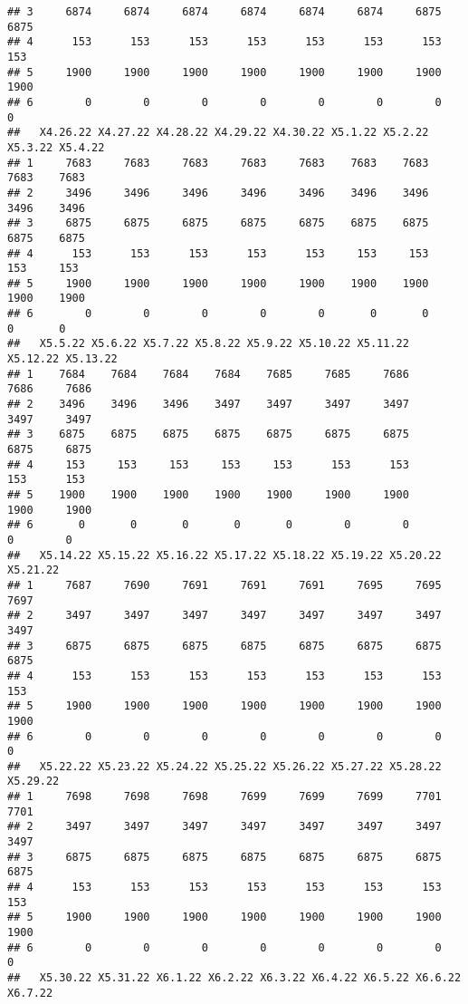 \documentclass[
]{article}
\begin{document}
\begin{verbatim}
## 3     6874     6874     6874     6874     6874     6874     6875     6875
## 4      153      153      153      153      153      153      153      153
## 5     1900     1900     1900     1900     1900     1900     1900     1900
## 6        0        0        0        0        0        0        0        0
##   X4.26.22 X4.27.22 X4.28.22 X4.29.22 X4.30.22 X5.1.22 X5.2.22 X5.3.22 X5.4.22
## 1     7683     7683     7683     7683     7683    7683    7683    7683    7683
## 2     3496     3496     3496     3496     3496    3496    3496    3496    3496
## 3     6875     6875     6875     6875     6875    6875    6875    6875    6875
## 4      153      153      153      153      153     153     153     153     153
## 5     1900     1900     1900     1900     1900    1900    1900    1900    1900
## 6        0        0        0        0        0       0       0       0       0
##   X5.5.22 X5.6.22 X5.7.22 X5.8.22 X5.9.22 X5.10.22 X5.11.22 X5.12.22 X5.13.22
## 1    7684    7684    7684    7684    7685     7685     7686     7686     7686
## 2    3496    3496    3496    3497    3497     3497     3497     3497     3497
## 3    6875    6875    6875    6875    6875     6875     6875     6875     6875
## 4     153     153     153     153     153      153      153      153      153
## 5    1900    1900    1900    1900    1900     1900     1900     1900     1900
## 6       0       0       0       0       0        0        0        0        0
##   X5.14.22 X5.15.22 X5.16.22 X5.17.22 X5.18.22 X5.19.22 X5.20.22 X5.21.22
## 1     7687     7690     7691     7691     7691     7695     7695     7697
## 2     3497     3497     3497     3497     3497     3497     3497     3497
## 3     6875     6875     6875     6875     6875     6875     6875     6875
## 4      153      153      153      153      153      153      153      153
## 5     1900     1900     1900     1900     1900     1900     1900     1900
## 6        0        0        0        0        0        0        0        0
##   X5.22.22 X5.23.22 X5.24.22 X5.25.22 X5.26.22 X5.27.22 X5.28.22 X5.29.22
## 1     7698     7698     7698     7699     7699     7699     7701     7701
## 2     3497     3497     3497     3497     3497     3497     3497     3497
## 3     6875     6875     6875     6875     6875     6875     6875     6875
## 4      153      153      153      153      153      153      153      153
## 5     1900     1900     1900     1900     1900     1900     1900     1900
## 6        0        0        0        0        0        0        0        0
##   X5.30.22 X5.31.22 X6.1.22 X6.2.22 X6.3.22 X6.4.22 X6.5.22 X6.6.22 X6.7.22

\end{verbatim}
\end{document}
